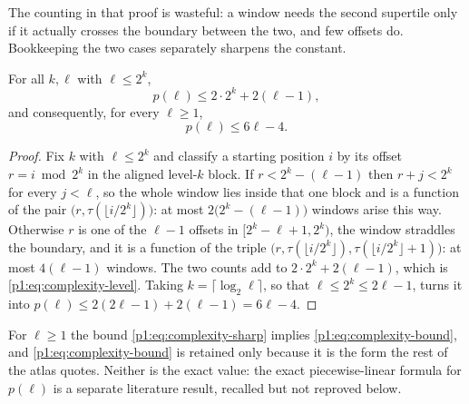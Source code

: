 \documentclass[11pt,oneside]{article}
\numberwithin{equation}{section}
\theoremstyle{definition}
\theoremstyle{remark}
\begin{document}
The counting in that proof is wasteful: a window needs the second
supertile only if it actually crosses the boundary between the two,
and few offsets do.  Bookkeeping the two cases separately sharpens the
constant.

\begin{proposition}
\label{p1:prop:complexity-sharp}
For all \(k,\ell\) with \(\ell\le2^k\),
\begin{equation}
  p(\ell)\le2\cdot2^k+2(\ell-1),
  \label{p1:eq:complexity-level}
\end{equation}
and consequently, for every \(\ell\ge1\),
\begin{equation}
  \boxed{p(\ell)\le6\ell-4.}
  \label{p1:eq:complexity-sharp}
\end{equation}
\end{proposition}

\begin{proof}
Fix \(k\) with \(\ell\le2^k\) and classify a starting position \(i\)
by its offset \(r=i\bmod2^k\) in the aligned level-\(k\) block.  If
\(r<2^k-(\ell-1)\) then \(r+j<2^k\) for every \(j<\ell\), so the whole
window lies inside that one block and is a function of the pair
\(\bigl(r,\tau(\lfloor i/2^k\rfloor)\bigr)\): at most
\(2\bigl(2^k-(\ell-1)\bigr)\) windows arise this way.  Otherwise \(r\)
is one of the \(\ell-1\) offsets in \([2^k-\ell+1,2^k)\), the window
straddles the boundary, and it is a function of the triple
\(\bigl(r,\tau(\lfloor i/2^k\rfloor),\tau(\lfloor
i/2^k\rfloor+1)\bigr)\): at most \(4(\ell-1)\) windows.  The two counts
add to \(2\cdot2^k+2(\ell-1)\), which is \eqref{p1:eq:complexity-level}.
Taking \(k=\lceil\log_2\ell\rceil\), so that \(\ell\le2^k\le2\ell-1\),
turns it into \(p(\ell)\le2(2\ell-1)+2(\ell-1)=6\ell-4\).
\end{proof}

For \(\ell\ge1\) the bound \eqref{p1:eq:complexity-sharp} implies
\eqref{p1:eq:complexity-bound}, and \eqref{p1:eq:complexity-bound} is
retained only because it is the form the rest of the atlas quotes.
Neither is the exact value: the exact piecewise-linear formula for
\(p(\ell)\) is a separate literature result, recalled but not
reproved below.
\end{document}

